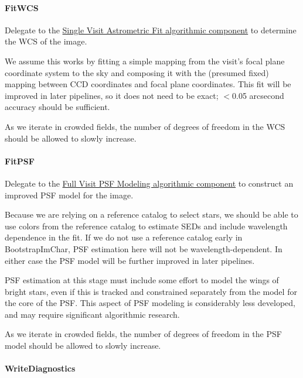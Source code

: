 \paragraph{FitWCS}
\label{sec:drpBootstrapImChar_FitWCS}

Delegate to the \hyperref[sec:acSingleVisitAstrometricFit]{Single Visit Astrometric Fit algorithmic component} to determine the WCS of the image.

We assume this works by fitting a simple mapping from the visit's focal plane coordinate system to the sky and composing it with the (presumed fixed) mapping between CCD coordinates and focal plane coordinates.  This fit will be improved in later pipelines, so it does not need to be exact; $<$0.05 arcsecond accuracy should be sufficient.

As we iterate in crowded fields, the number of degrees of freedom in the WCS should be allowed to slowly increase.

\paragraph{FitPSF}
\label{sec:drpBootstrapImChar_FitPSF}

Delegate to the \hyperref[sec:acFullVisitPSF]{Full Visit PSF Modeling algorithmic component} to construct an improved PSF model for the image.

Because we are relying on a reference catalog to select stars, we should be able to use colors from the reference catalog to estimate SEDs and include wavelength dependence in the fit.  If we do not use a reference catalog early in BootstrapImChar, PSF estimation here will not be wavelength-dependent.  In either case the PSF model will be further improved in later pipelines.

PSF estimation at this stage must include some effort to model the wings of bright stars, even if this is tracked and constrained separately from the model for the core of the PSF.  This aspect of PSF modeling is considerably less developed, and may require significant algorithmic research.

As we iterate in crowded fields, the number of degrees of freedom in the PSF model should be allowed to slowly increase.

\paragraph{WriteDiagnostics}
\label{sec:drpBootstrapImChar_WriteDiagnostics}

